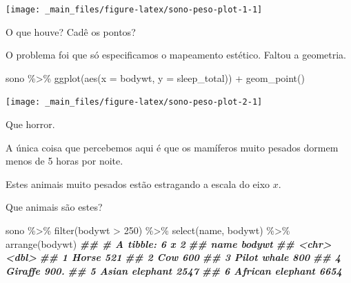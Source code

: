 \documentclass[
  12pt]{report}
\newenvironment{Shaded}{\begin{snugshade}}{\end{snugshade}}
\newcommand{\AttributeTok}[1]{\textcolor[rgb]{0.77,0.63,0.00}{#1}}
\newcommand{\DecValTok}[1]{\textcolor[rgb]{0.00,0.00,0.81}{#1}}
\newcommand{\DocumentationTok}[1]{\textcolor[rgb]{0.56,0.35,0.01}{\textbf{\textit{#1}}}}
\newcommand{\FunctionTok}[1]{\textcolor[rgb]{0.00,0.00,0.00}{#1}}
\newcommand{\NormalTok}[1]{#1}
\newcommand{\SpecialCharTok}[1]{\textcolor[rgb]{0.00,0.00,0.00}{#1}}
\begin{document}
\begin{center}\texttt{[image: \_main\_files/figure-latex/sono-peso-plot-1-1]} \end{center}

O que houve? Cadê os pontos?

O problema foi que só especificamos o mapeamento estético. Faltou a geometria.

\begin{Shaded}
\begin{Highlighting}[]
\NormalTok{sono }\SpecialCharTok{\%\textgreater{}\%} 
  \FunctionTok{ggplot}\NormalTok{(}\FunctionTok{aes}\NormalTok{(}\AttributeTok{x =}\NormalTok{ bodywt, }\AttributeTok{y =}\NormalTok{ sleep\_total)) }\SpecialCharTok{+}
  \FunctionTok{geom\_point}\NormalTok{()}
\end{Highlighting}
\end{Shaded}

\begin{center}\texttt{[image: \_main\_files/figure-latex/sono-peso-plot-2-1]} \end{center}

Que horror.

A única coisa que percebemos aqui é que os mamíferos muito pesados dormem menos de 5 horas por noite.

Estes animais muito pesados estão estragando a escala do eixo \(x\).

Que animais são estes?

\begin{Shaded}
\begin{Highlighting}[]
\NormalTok{sono }\SpecialCharTok{\%\textgreater{}\%} 
  \FunctionTok{filter}\NormalTok{(bodywt }\SpecialCharTok{\textgreater{}} \DecValTok{250}\NormalTok{) }\SpecialCharTok{\%\textgreater{}\%} 
  \FunctionTok{select}\NormalTok{(name, bodywt) }\SpecialCharTok{\%\textgreater{}\%} 
  \FunctionTok{arrange}\NormalTok{(bodywt)}
\DocumentationTok{\#\# \# A tibble: 6 x 2}
\DocumentationTok{\#\#   name             bodywt}
\DocumentationTok{\#\#   \textless{}chr\textgreater{}             \textless{}dbl\textgreater{}}
\DocumentationTok{\#\# 1 Horse              521 }
\DocumentationTok{\#\# 2 Cow                600 }
\DocumentationTok{\#\# 3 Pilot whale        800 }
\DocumentationTok{\#\# 4 Giraffe            900.}
\DocumentationTok{\#\# 5 Asian elephant    2547 }
\DocumentationTok{\#\# 6 African elephant  6654}
\end{Highlighting}
\end{Shaded}
\end{document}
